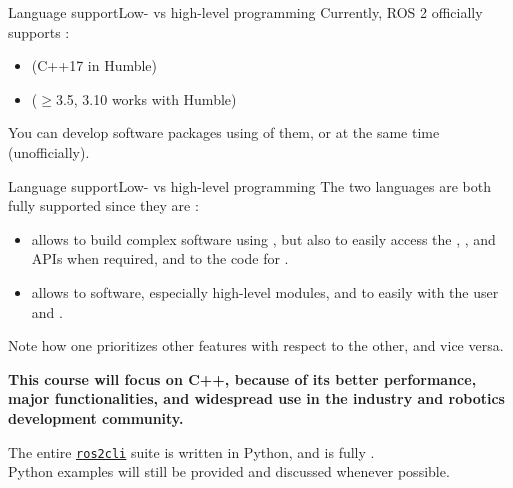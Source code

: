 \begin{frame}{Language support}{Low- vs high-level programming}
  Currently, ROS 2 officially supports :
  \begin{itemize}
    \item {} (C++17 in Humble)
    \item {} ($\geq$3.5, 3.10 works with Humble)
  \end{itemize}
  You can develop software packages using  of them, or  at the same time (unofficially).
\end{frame}
\begin{frame}{Language support}{Low- vs high-level programming}
  The two languages are both fully supported since they are :
  \begin{itemize}
    \item {} allows to build complex software using , but also to easily access the , , and  APIs when required, and to  the code for .
    \item {} allows to  software, especially high-level modules, and to easily  with the user and .
  \end{itemize}
  Note how one prioritizes other features with respect to the other, and vice versa.
  \begin{block}{}
    \centering
    \textbf{This course will focus on C++, because of its better performance, major functionalities, and widespread use in the industry and robotics development community.}
  \end{block}
  The entire \href{https://github.com/ros2/ros2cli/tree/humble}{\color{blue}\underline{\texttt{ros2cli}}} suite is written in Python, and is fully .\\
  Python examples will still be provided and discussed whenever possible.
\end{frame}
